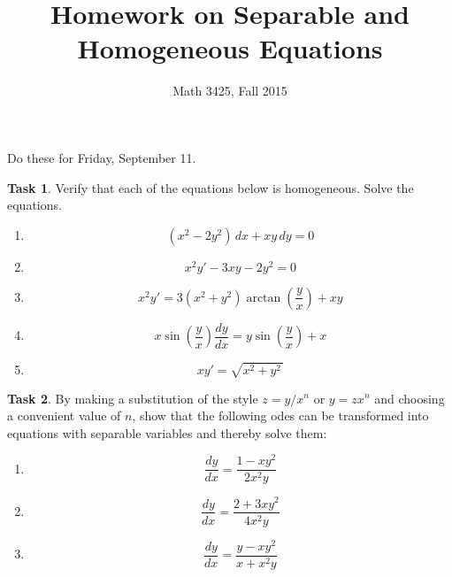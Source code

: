 \documentclass[11pt]{amsart}
\theoremstyle{definition}
\newtheorem{task}{Task}
\begin{document}
\title{Homework on Separable and Homogeneous Equations}
\author{Math 3425, Fall 2015}
\maketitle

Do these for Friday, September 11.

\begin{task}
Verify that each of the equations below is homogeneous. Solve the equations.
\begin{enumerate}
\item $$(x^2-2y^2)\, dx + xy \, dy = 0$$
\item $$x^2y' - 3xy - 2y^2 = 0$$
\item $$x^2y' = 3(x^2+y^2)\arctan\left(\dfrac{y}{x}\right) + xy $$
\item $$x\sin\left(\dfrac{y}{x}\right) \dfrac{dy}{dx} = y\sin\left(\dfrac{y}{x}\right) + x$$
\item $$xy' = \sqrt{x^2+y^2\,}$$
\end{enumerate}
\end{task}

\vspace{1in}

\begin{task}
By making a substitution of the style $z = y/x^n$ or $y = zx^n$ and choosing a
convenient value of $n$, show that the following odes can be transformed into equations
with separable variables and thereby solve them:
\begin{enumerate}
\item $$\dfrac{dy}{dx} = \dfrac{1-xy^2}{2x^2y}$$
\item $$\dfrac{dy}{dx} = \dfrac{2+3xy^2}{4x^2y}$$
\item $$\dfrac{dy}{dx} = \dfrac{y-xy^2}{x+x^2y}$$
\end{enumerate}
\end{task}
\end{document}
